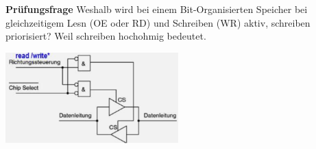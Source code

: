 \textbf{Prüfungsfrage}\newline
Weshalb wird bei einem Bit-Organisierten Speicher bei gleichzeitigem Lesn (OE oder RD) und Schreiben (WR) aktiv, schreiben priorisiert?\newline
Weil schreiben hochohmig bedeutet.
\begin{minipage}{0.5\linewidth}
    \includegraphics[width=0.5\textwidth]{images/SystembusSpeicherSpeichersystem/SpeicherSysDirectMemPrue}
\end{minipage}

